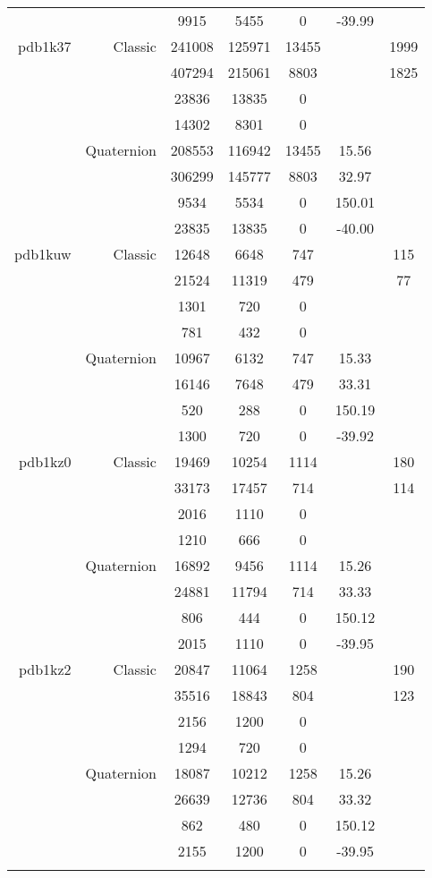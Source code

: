\begin{xltabular}{\textwidth}{r|rcccSc}
& & 9915 & 5455 & 0 & -39.99 & \\ \addlinespace
pdb1k37 & Classic & 241008 & 125971 & 13455 & & 1999 \\
& & 407294 & 215061 & 8803 & & 1825 \\
& & 23836 & 13835 & 0 & & \\
& & 14302 & 8301 & 0 & & \\
& Quaternion & 208553 & 116942 & 13455 & 15.56 & \\
& & 306299 & 145777 & 8803 & 32.97 & \\
& & 9534 & 5534 & 0 & 150.01 & \\
& & 23835 & 13835 & 0 & -40.00 & \\ \addlinespace
pdb1kuw & Classic & 12648 & 6648 & 747 & & 115 \\
& & 21524 & 11319 & 479 & & 77 \\
& & 1301 & 720 & 0 & & \\
& & 781 & 432 & 0 & & \\
& Quaternion & 10967 & 6132 & 747 & 15.33 & \\
& & 16146 & 7648 & 479 & 33.31 & \\
& & 520 & 288 & 0 & 150.19 & \\
& & 1300 & 720 & 0 & -39.92 & \\ \addlinespace
pdb1kz0 & Classic & 19469 & 10254 & 1114 & & 180 \\
& & 33173 & 17457 & 714 & & 114 \\
& & 2016 & 1110 & 0 & & \\
& & 1210 & 666 & 0 & & \\
& Quaternion & 16892 & 9456 & 1114 & 15.26 & \\
& & 24881 & 11794 & 714 & 33.33 & \\
& & 806 & 444 & 0 & 150.12 & \\
& & 2015 & 1110 & 0 & -39.95 & \\ \addlinespace
pdb1kz2 & Classic & 20847 & 11064 & 1258 & & 190 \\
& & 35516 & 18843 & 804 & & 123 \\
& & 2156 & 1200 & 0 & & \\
& & 1294 & 720 & 0 & & \\
& Quaternion & 18087 & 10212 & 1258 & 15.26 & \\
& & 26639 & 12736 & 804 & 33.32 & \\
& & 862 & 480 & 0 & 150.12 & \\
& & 2155 & 1200 & 0 & -39.95 & \\ \addlinespace

\end{xltabular}
